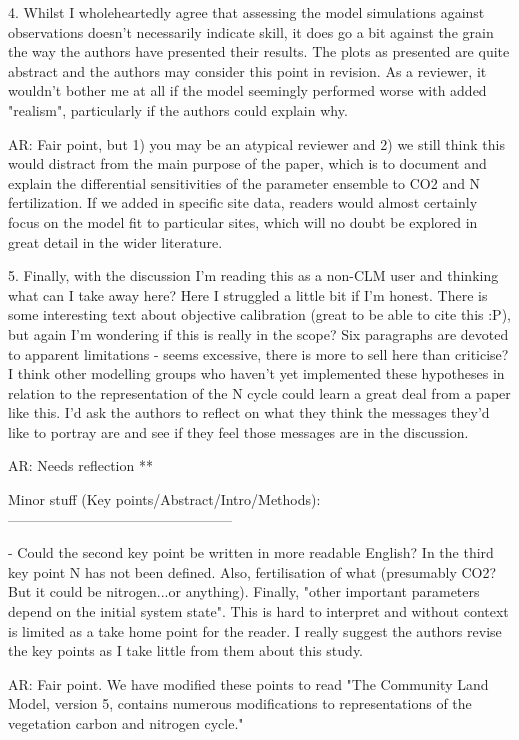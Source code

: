 \documentclass{article}
\begin{document}
4. Whilst I wholeheartedly agree that assessing the model simulations against observations doesn't necessarily indicate skill, it does go a bit against the grain the way the authors have presented their results. The plots as presented are quite abstract and the authors may consider this point in revision. As a reviewer, it wouldn't bother me at all if the model seemingly performed worse with added "realism", particularly if the authors could explain why. 

\textsf{AR: Fair point, but 1) you may be an atypical reviewer and 2) we still think this would distract from the main purpose of the paper, which is to document and explain the differential sensitivities of the parameter ensemble to CO2 and N fertilization. If we added in specific site data, readers would almost certainly focus on the model fit to particular sites, which will no doubt be explored in great detail in the wider literature.} 

5. Finally, with the discussion I'm reading this as a non-CLM user and thinking what can I take away here? Here I struggled a little bit if I'm honest. There is some interesting text about objective calibration (great to be able to cite this :P), but again I'm wondering if this is really in the scope? Six paragraphs are devoted to apparent limitations - seems excessive, there is more to sell here than criticise? I think other modelling groups who haven't yet implemented these hypotheses in relation to the representation of the N cycle could learn a great deal from a paper like this. I'd ask the authors to reflect on what they think the messages they'd like to portray are and see if they feel those messages are in the discussion. 

\textsf{AR: Needs reflection **}

Minor stuff (Key points/Abstract/Intro/Methods): 
------------------------------------------------ 

- Could the second key point be written in more readable English? In the third key point N has not been defined. Also, fertilisation of what (presumably CO2? But it could be nitrogen...or anything). Finally, "other important parameters depend on the initial system state". This is hard to interpret and without context is limited as a take home point for the reader. I really suggest the authors revise the key points as I take little from them about this study. 

\textsf{AR: Fair point. We have modified these points to read 
"The Community Land Model, version 5, contains numerous modifications to representations of the vegetation carbon and nitrogen cycle."}
\end{document}
